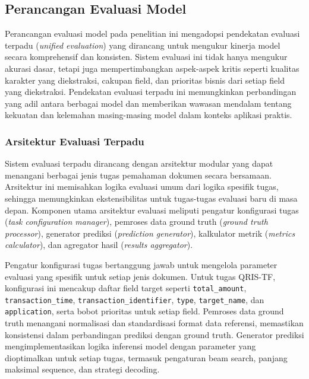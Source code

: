 \subsection{Perancangan Evaluasi Model}
\label{subsec:perancangan-evaluasi-model}

Perancangan evaluasi model pada penelitian ini mengadopsi pendekatan evaluasi terpadu (\textit{unified evaluation}) yang dirancang untuk mengukur kinerja model secara komprehensif dan konsisten. Sistem evaluasi ini tidak hanya mengukur akurasi dasar, tetapi juga mempertimbangkan aspek-aspek kritis seperti kualitas karakter yang diekstraksi, cakupan field, dan prioritas bisnis dari setiap field yang diekstraksi. Pendekatan evaluasi terpadu ini memungkinkan perbandingan yang adil antara berbagai model dan memberikan wawasan mendalam tentang kekuatan dan kelemahan masing-masing model dalam konteks aplikasi praktis.

\subsubsection{Arsitektur Evaluasi Terpadu}

Sistem evaluasi terpadu dirancang dengan arsitektur modular yang dapat menangani berbagai jenis tugas pemahaman dokumen secara bersamaan. Arsitektur ini memisahkan logika evaluasi umum dari logika spesifik tugas, sehingga memungkinkan ekstensibilitas untuk tugas-tugas evaluasi baru di masa depan. Komponen utama arsitektur evaluasi meliputi pengatur konfigurasi tugas (\textit{task configuration manager}), pemroses data ground truth (\textit{ground truth processor}), generator prediksi (\textit{prediction generator}), kalkulator metrik (\textit{metrics calculator}), dan agregator hasil (\textit{results aggregator}).

Pengatur konfigurasi tugas bertanggung jawab untuk mengelola parameter evaluasi yang spesifik untuk setiap jenis dokumen. Untuk tugas QRIS-TF, konfigurasi ini mencakup daftar field target seperti \texttt{total\_amount}, \texttt{transaction\_time}, \texttt{transaction\_identifier}, \texttt{type}, \texttt{target\_name}, dan \texttt{application}, serta bobot prioritas untuk setiap field. Pemroses data ground truth menangani normalisasi dan standardisasi format data referensi, memastikan konsistensi dalam perbandingan prediksi dengan ground truth. Generator prediksi mengimplementasikan logika inferensi model dengan parameter yang dioptimalkan untuk setiap tugas, termasuk pengaturan beam search, panjang maksimal sequence, dan strategi decoding.

